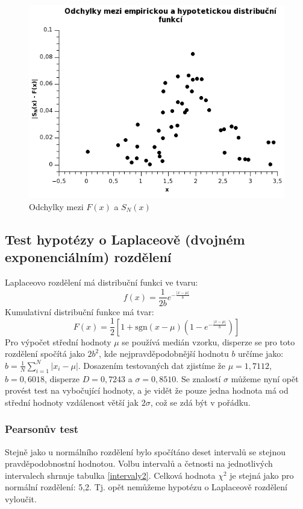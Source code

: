 \documentclass[12pt]{article}
\begin{document}
\begin{figure}[h!]
  \centering
  \includegraphics[width=13cm]{Graph6.png}
  \caption{Odchylky mezi $F(x)$ a $S_N(x)$}
  \label{fig:kol2} 
\end{figure}

\clearpage


\subsection{Test hypotézy o Laplaceově (dvojném exponenciálním) rozdělení}
Laplaceovo rozdělení má distribuční funkci ve tvaru:
\begin{equation}f(x)  = \frac{1}{2b} e^{-\frac{|x-\mu|}{b}}    \end{equation}
Kumulativní distribuční funkce má tvar:
\begin{equation}F(x)  = \frac{1}{2} [ 1 + \mathrm{sgn}(x-\mu) (1-e^{-\frac{|x-\mu|}{b}}) ] \end{equation}
Pro výpočet střední hodnoty $\mu$ se používá medián vzorku, disperze se pro toto rozdělení spočítá jako $2b^2$, kde nejpravděpodobnější hodnotu $b$ určíme jako: $b = \frac{1}{N}\sum_{i=1}^N|x_i - \mu|$. Dosazením testovaných dat zjistíme že $\mu = 1,7112$, $b = 0,6018$, disperze $D = 0,7243$ a $\sigma = 0,8510$. Se znalostí $\sigma$ můžeme nyní opět provést test na vybočující hodnoty, a je vidět že pouze jedna hodnota má od střední hodnoty vzdálenost větší jak $2\sigma$, což se zdá být v pořádku.

\subsubsection{Pearsonův test}
Stejně jako u normálního rozdělení bylo spočítáno deset intervalů se stejnou pravděpodobnostní hodnotou. Volbu intervalů a četnosti na jednotlivých intervalech shrnuje tabulka \ref{intervaly2}. Celková hodnota $\chi^2$ je stejná jako pro normální rozdělení: 5,2. Tj. opět nemůžeme hypotézu o Laplaceově rozdělení vyloučit.
\end{document}

